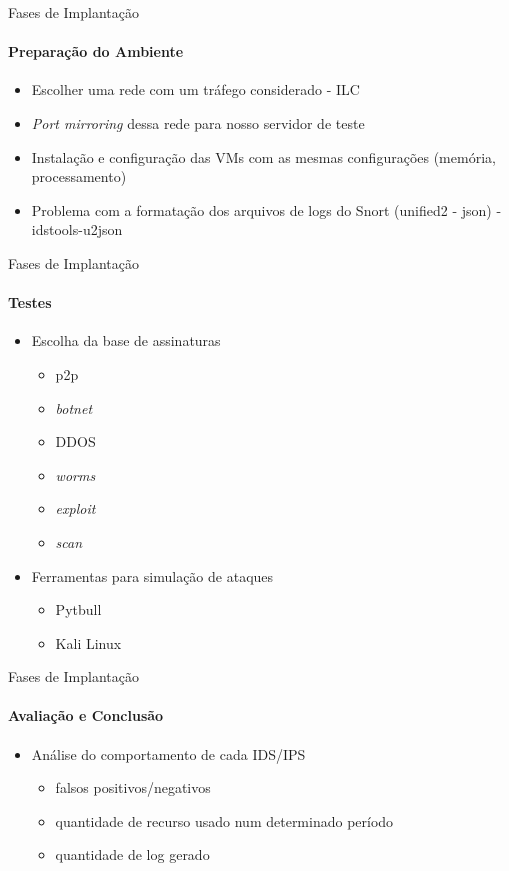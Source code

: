 \documentclass[aspectratio=169]{beamer}
\begin{document}
\begin{frame}{Fases de Implantação}
  \framesubtitle{Preparação do Ambiente}
  \begin{itemize}
  	\item Escolher uma rede com um tráfego considerado - ILC
  	\item \textit{Port mirroring} dessa rede para nosso servidor de teste
  	\item Instalação e configuração das VMs com as mesmas configurações (memória, processamento)
  	\item Problema com a formatação dos arquivos de logs do Snort (unified2 - json) - idstools-u2json
  \end{itemize}
\end{frame}

\begin{frame}{Fases de Implantação}
  \framesubtitle{Testes}
  \begin{itemize}
  	\item Escolha da base de assinaturas
 		\begin{itemize}
 			\item p2p
 			\item \textit{botnet}
 			\item DDOS
 			\item \textit{worms}
 			\item \textit{exploit}
 			\item \textit{scan}
 		\end{itemize}
 	\item Ferramentas para simulação de ataques
 		\begin{itemize}
 			\item Pytbull
 			\item Kali Linux
 		\end{itemize}
  \end{itemize}
\end{frame}

\begin{frame}{Fases de Implantação}
  \framesubtitle{Avaliação e Conclusão}
  \begin{itemize}
  	\item Análise do comportamento de cada IDS/IPS
  		\begin{itemize}
  			\item falsos positivos/negativos
  			\item quantidade de recurso usado num determinado período
  			\item quantidade de log gerado
  		\end{itemize}
  \end{itemize}
\end{frame}
\end{document}
